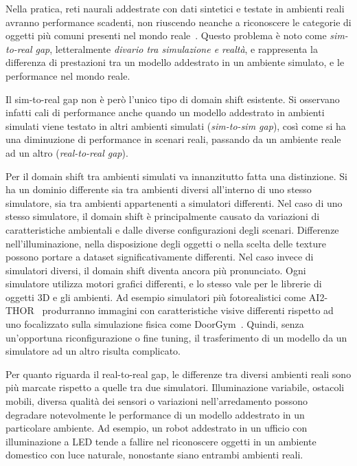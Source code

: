 \documentclass[12pt]{report}
\begin{document}
Nella pratica, reti naurali addestrate con dati sintetici e testate in ambienti reali avranno performance scadenti, non riuscendo neanche a riconoscere le categorie di oggetti più comuni presenti nel mondo reale~\cite{8793591}. Questo problema è noto come \textit{sim-to-real gap}, letteralmente \textit{divario tra simulazione e realtà}, e rappresenta la differenza di prestazioni tra un modello addestrato in un ambiente simulato, e le performance nel mondo reale.

Il sim-to-real gap non è però l'unico tipo di domain shift esistente. Si osservano infatti cali di performance anche quando un modello addestrato in ambienti simulati viene testato in altri ambienti simulati (\textit{sim-to-sim gap}), così come si ha una diminuzione di performance in scenari reali, passando da un ambiente reale ad un altro (\textit{real-to-real gap}).

Per il domain shift tra ambienti simulati va innanzitutto fatta una distinzione. Si ha un dominio differente sia tra ambienti diversi all'interno di uno stesso simulatore, sia tra ambienti appartenenti a simulatori differenti. Nel caso di uno stesso simulatore, il domain shift è principalmente causato da variazioni di caratteristiche ambientali e dalle diverse configurazioni degli scenari. Differenze nell'illuminazione, nella disposizione degli oggetti o nella scelta delle texture possono portare a dataset significativamente differenti. Nel caso invece di simulatori diversi, il domain shift diventa ancora più pronunciato. Ogni simulatore utilizza motori grafici differenti, e lo stesso vale per le librerie di oggetti 3D e gli ambienti. Ad esempio simulatori più fotorealistici come AI2-THOR~\cite{kolve2022ai2thorinteractive3denvironment} produrranno immagini con caratteristiche visive differenti rispetto ad uno focalizzato sulla simulazione fisica come DoorGym~\cite{urakami2022doorgymscalabledooropening}. Quindi, senza un'opportuna riconfigurazione o fine tuning, il trasferimento di un modello da un simulatore ad un altro risulta complicato.

Per quanto riguarda il real-to-real gap, le differenze tra diversi ambienti reali sono più marcate rispetto a quelle tra due simulatori. Illuminazione variabile, ostacoli mobili, diversa qualità dei sensori o variazioni nell'arredamento possono degradare notevolmente le performance di un modello addestrato in un particolare ambiente. Ad esempio, un robot addestrato in un ufficio con illuminazione a LED tende a fallire nel riconoscere oggetti in un ambiente domestico con luce naturale, nonostante siano entrambi ambienti reali.
\end{document}
